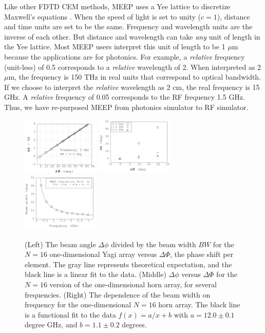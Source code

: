 \documentclass[../../main.tex]{subfiles}
\begin{document}
Like other FDTD CEM methods, MEEP uses a Yee lattice to discretize Maxwell's equations \cite{10.1109/tap.1966.1138693}.  When the speed of light is set to unity ($c = 1$), distance and time units are set to be the same.  Frequency and wavelength units are the inverse of each other.  But distance and wavelength can take \textit{any} unit of length in the Yee lattice.  Most MEEP users interpret this unit of length to be 1 $\mu$m because the applications are for photonics.  For example, a \textit{relative} frequency (unit-less) of 0.5 corresponds to a \textit{relative} wavelength of 2.  When interpreted as 2 $\mu$m, the frequency is 150 THz in real units that correspond to optical bandwidth.  If we choose to interpret the \textit{relative} wavelength as 2 cm, the real frequency is 15 GHz.  A \textit{relative} frequency of 0.05 corresponds to the RF frequency 1.5 GHz.  Thus, we have re-purposed MEEP from photonics simulator to RF simulator.  \\ \vspace{2.5mm}

\begin{figure}
\centering
\includegraphics[width=0.33\textwidth]{figures/Oct30_plot1.png}
\includegraphics[width=0.33\textwidth]{figures/Aug11_plot2.png}
\includegraphics[width=0.33\textwidth]{figures/Aug11_plot1.png}
\caption{\label{fig:pa_1} (Left) The beam angle $\Delta \phi$ divided by the beam width $BW$ for the $N = 16$ one-dimensional Yagi array versus $\Delta \Phi$, the phase shift per element. The gray line represents theoretical expectation, and the black line is a linear fit to the data.  (Middle) $\Delta \phi$ versus $\Delta \Phi$ for the $N=16$ version of the one-dimensional horn array, for several frequencies.  (Right) The dependence of the beam width on frequency for the one-dimensional $N=16$ horn array.  The black line is a functional fit to the data $f(x) = a/x + b$ with $a=12.0\pm 0.1$ degree GHz, and $b=1.1\pm 0.2$ degrees.}
\end{figure}
\end{document}
